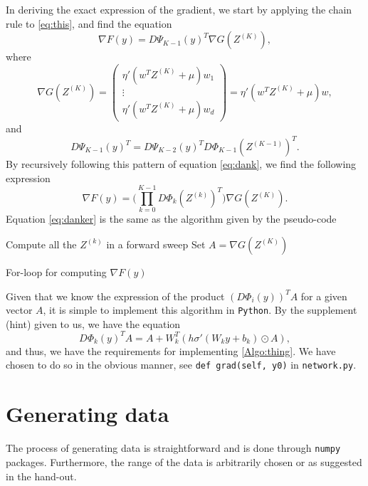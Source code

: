 \documentclass{article}
\begin{document}
In deriving the exact expression of the gradient, we start by applying the chain rule to \eqref{eq:this}, and find the equation
\begin{equation}
    \nabla F(y) = D\Psi_{K-1}(y)^T\nabla G(Z^{(K)}),
\end{equation}
where \[\nabla G(Z^{(K)}) = 
\begin{pmatrix}
\eta'(w^T Z^{(K)}+\mu)w_1 \\ 
\vdots \\
\eta'(w^T Z^{(K)}+\mu)w_d 
\end{pmatrix} 
= \eta'(w^T Z^{(K)}+\mu)w, \]
and
\begin{equation}
    \label{eq:dank}
    D\Psi_{K-1}(y)^T = D\Psi_{K-2}(y)^TD\Phi_{K-1}(Z^{(K-1)})^T.
\end{equation}
By recursively following this pattern of equation \eqref{eq:dank}, we find the following expression 
\begin{equation}
    \label{eq:danker}
    \nabla F(y) = \bigg(\prod_{k=0}^{K-1}D\Phi_k (Z^{(k)})^T\bigg)\nabla G(Z^{(K)}).
\end{equation}
Equation \eqref{eq:danker} is the same as the algorithm given by the pseudo-code 
\begin{algorithm}[h!]
    Compute all the $Z^{(k)}$ in a forward sweep\;
    Set $A = \nabla G(Z^{(K)})$\;
 \caption{For-loop for computing $\nabla F(y)$}
 \label{Algo:thing}
\end{algorithm}

\noindent Given that we know the expression of the product $(D\Phi_i(y))^T A$ for a given vector $A$, it is simple to implement this algorithm in \verb|Python|. By the supplement (hint) given to us, we have the equation
\begin{equation}
    D\Phi_k (y)^TA = A +W_k^T(h\sigma'(W_k y+b_k)\odot A),
\end{equation}
and thus, we have the requirements for implementing \autoref*{Algo:thing}. We have chosen to do so in the obvious manner, see \verb|def grad(self, y0)| in \verb|network.py|.

\section{Generating data}
The process of generating data is straightforward and is done through \verb|numpy| packages. Furthermore, the range of the data is arbitrarily chosen or as suggested in the hand-out. 
\end{document}
